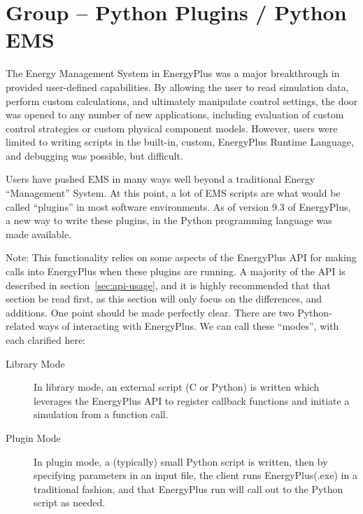 \section{Group -- Python Plugins / Python EMS}\label{group-plugins}

The Energy Management System in EnergyPlus was a major breakthrough in provided user-defined capabilities.
By allowing the user to read simulation data, perform custom calculations, and ultimately manipulate control settings, the door was opened to any number of new applications, including evaluation of custom control strategies or custom physical component models.
However, users were limited to writing scripts in the built-in, custom, EnergyPlus Runtime Language, and debugging was possible, but difficult.

Users have pushed EMS in many ways well beyond a traditional Energy ``Management'' System.
At this point, a lot of EMS scripts are what would be called ``plugins'' in most software environments.
As of version 9.3 of EnergyPlus, a new way to write these plugins, in the Python programming language was made available.

Note: This functionality relies on some aspects of the EnergyPlus API for making calls into EnergyPlus when these plugins are running.
A majority of the API is described in section~\ref{sec:api-usage}, and it is highly recommended that that section be read first, as this section will only focus on the differences, and additions.
One point should be made perfectly clear.
There are two Python-related ways of interacting with EnergyPlus.
We can call these ``modes'', with each clarified here:

\begin{description}
    \item[Library Mode] In library mode, an external script (C or Python) is written which leverages the EnergyPlus API to register callback functions and initiate a simulation from a function call.
    \item[Plugin Mode] In plugin mode, a (typically) small Python script is written, then by specifying parameters in an input file, the client runs EnergyPlus(.exe) in a traditional fashion, and that EnergyPlus run will call out to the Python script as needed.
\end{description}

